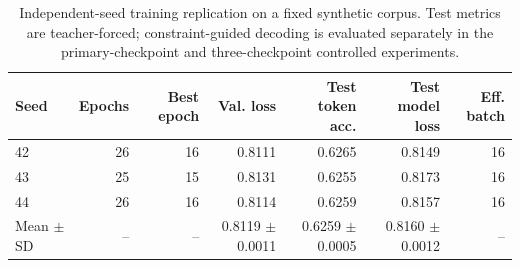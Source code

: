 \begin{table}[t]
\centering
\small
\begin{tabular}{lrrrrrr}
\toprule
Seed & Epochs & Best epoch & Val. loss & Test token acc. & Test model loss & Eff. batch \\
\midrule
42 & 26 & 16 & 0.8111 & 0.6265 & 0.8149 & 16 \\
43 & 25 & 15 & 0.8131 & 0.6255 & 0.8173 & 16 \\
44 & 26 & 16 & 0.8114 & 0.6259 & 0.8157 & 16 \\
\midrule
Mean $\pm$ SD & -- & -- & 0.8119 $\pm$ 0.0011 & 0.6259 $\pm$ 0.0005 & 0.8160 $\pm$ 0.0012 & -- \\
\bottomrule
\end{tabular}
\caption{Independent-seed training replication on a fixed synthetic corpus. Test metrics are teacher-forced; constraint-guided decoding is evaluated separately in the primary-checkpoint and three-checkpoint controlled experiments.}
\label{tab:multiseed-training}
\end{table}

